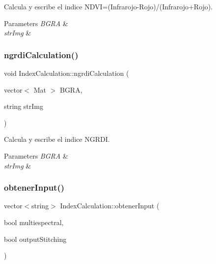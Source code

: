 Calcula y escribe el indice N\+D\+VI=(Infrarojo-\/\+Rojo)/(Infrarojo+\+Rojo). 


\begin{DoxyParams}{Parameters}
{\em B\+G\+RA} & \\
\hline
{\em str\+Img} & \\
\hline
\end{DoxyParams}
\mbox{\label{classIndexCalculation_ae42cea9b3bb253446995a80ae01ff429}} 
\subsubsection{\texorpdfstring{ngrdi\+Calculation()}{ngrdiCalculation()}}
{\footnotesize\ttfamily void Index\+Calculation\+::ngrdi\+Calculation (\begin{DoxyParamCaption}\item[{vector$<$ Mat $>$}]{B\+G\+RA,  }\item[{string}]{str\+Img }\end{DoxyParamCaption})\hspace{0.3cm}{\ttfamily [inline]}}



Calcula y escribe el indice N\+G\+R\+DI. 


\begin{DoxyParams}{Parameters}
{\em B\+G\+RA} & \\
\hline
{\em str\+Img} & \\
\hline
\end{DoxyParams}
\mbox{\label{classIndexCalculation_a65a88228b2caf575cbbac793a03d1dd6}} 
\subsubsection{\texorpdfstring{obtener\+Input()}{obtenerInput()}}
{\footnotesize\ttfamily vector$<$string$>$ Index\+Calculation\+::obtener\+Input (\begin{DoxyParamCaption}\item[{bool}]{multiespectral,  }\item[{bool}]{output\+Stitching }\end{DoxyParamCaption})\hspace{0.3cm}{\ttfamily [inline]}}



